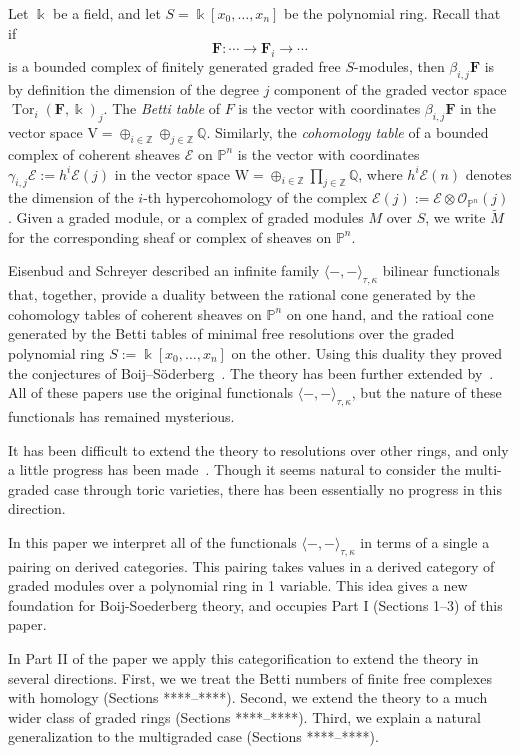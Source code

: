 \documentclass[12pt]{amsart}
\theoremstyle{definition}
\theoremstyle{remark}
\newcommand{\Tor}{\operatorname{Tor}}
\newcommand{\kk}{\Bbbk}
\newcommand{\PP}{\mathbb{P}}
\newcommand{\ZZ}{\mathbb{Z}}
\newcommand{\QQ}{\mathbb{Q}}
\newcommand{\VV}{\mathrm{V}}
\newcommand{\WW}{\mathrm{W}}
\newcommand{\cO}{\mathcal{O}}
\newcommand{\cE}{\mathcal{E}}
\newcommand{\FF}{\mathbf{F}}
\begin{document}
Let $\kk$ be a field, and let $S=\kk[x_0, \dots, x_n]$ be the polynomial ring. Recall that if 
$$
\FF: \cdots \to \FF_{i}\to \cdots
$$
is a bounded complex of finitely generated graded free $S$-modules, then $\beta_{i,j}\FF$ is by definition the dimension of the degree $j$ component of the graded vector space $\Tor_i(\FF,\kk)_j$.  The \emph{Betti table} of $F$ is the vector with coordinates $\beta_{i,j}\FF$ in the vector space $\VV = \oplus_{i\in \ZZ} \oplus_{j\in \ZZ}\QQ$. Similarly, the \emph{cohomology table} of a bounded complex of coherent sheaves $\cE$ on $\PP^{n}$ is the vector with coordinates $\gamma_{i,j}\cE := h^{i}\cE(j)$ in the vector space $\WW = \oplus_{i\in \ZZ}\prod_{j\in \ZZ}\QQ$, where $h^{i}\cE(n)$ denotes the dimension of the $i$-th hypercohomology of the complex $\cE(j) := \cE \otimes \cO_{\PP^{n}}(j)$. 
Given a graded module, or a complex of graded modules $M$ over $S$, we write $\widetilde M$ for the corresponding sheaf or complex of sheaves on $\PP^{n}$. 


Eisenbud and Schreyer \cite{eis-schrey1} described an infinite family $\langle -,-\rangle_{\tau,\kappa}$ bilinear functionals that, together, provide a duality between the rational cone generated by the cohomology tables of coherent sheaves on $\PP^n$ on one hand,  and the ratioal cone generated by the Betti tables of minimal free resolutions over the graded polynomial ring $S:=\kk[x_0, \dots, x_n]$ on the other. Using this duality they proved the conjectures of Boij--S\"oderberg~\cite{boij-sod1}. The theory has been further extended by~\cite{boij-sod2,eis-schrey2}. All of these papers use the original functionals $\langle -,-\rangle_{\tau,\kappa}$, but the nature of these functionals has remained mysterious. 

It has been difficult to extend the theory to resolutions over other rings, and only a little progress has been made~\cites{beks-local,boij-floystad,eis-schrey-abel,floystad-multigraded}. Though it seems natural to consider the multi-graded case through toric varieties, there has been essentially no progress in this direction.

In this paper we interpret all of the functionals $\langle-,-\rangle_{\tau,\kappa}$ in terms of a single a pairing on derived categories. This pairing takes values in a derived category of graded modules over a polynomial ring in 1 variable.  This idea gives a new foundation for Boij-Soederberg theory, and occupies Part I (Sections 1--3) of this paper. 

In Part II of the paper we apply this categorification  to extend the theory in several directions.  First, we we treat the Betti numbers of finite free complexes with homology (Sections ****--****). Second,  we extend the theory to a much wider class of graded rings (Sections ****--****).  Third, we explain a natural generalization to the multigraded case (Sections ****--****).
\end{document}
